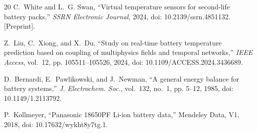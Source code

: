 \documentclass[conference]{IEEEtran}
\begin{document}
\begin{thebibliography}{20}
C.~White and L.~G. Swan, ``Virtual temperature sensors for second-life battery packs,'' \emph{SSRN Electronic Journal}, 2024, doi: 10.2139/ssrn.4851132. [Preprint].

Z.~Liu, C.~Xiong, and X.~Du, ``Study on real-time battery temperature prediction based on coupling of multiphysics fields and temporal networks,'' \emph{IEEE Access}, vol.~12, pp. 105511--105526, 2024, doi: 10.1109/ACCESS.2024.3436689.

D.~Bernardi, E.~Pawlikowski, and J.~Newman, ``A general energy balance for battery systems,'' \emph{J. Electrochem. Soc.}, vol.~132, no.~1, pp. 5--12, 1985, doi: 10.1149/1.2113792.

P.~Kollmeyer, ``Panasonic 18650PF Li-ion battery data,'' Mendeley Data, V1, 2018, doi: 10.17632/wykht8y7tg.1.

\end{thebibliography}
\end{document}
